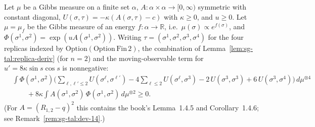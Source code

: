 \begin{lemma}\label{lem:sg-tal:replica-decoupling}
  \leanok
{}
Let $\mu$ be a Gibbs measure on a finite set $\alpha$, $A : \alpha\times\alpha\to[0,\infty)$ symmetric with constant diagonal, $U(\sigma,\tau) = -\kappa (A(\sigma,\tau) - c)$ with $\kappa\ge0$, and $u\ge 0$.
Let $\mu=\mu_f$ be the Gibbs measure of an energy $f:\alpha\to\mathbb R$, i.e.\ $\mu(\sigma)\propto e^{f(\sigma)}$, and $\Phi(\sigma^1,\sigma^2) = \exp(u A(\sigma^1,\sigma^2))$. Writing $\tau=(\sigma^1,\sigma^2,\sigma^3,\sigma^4)$ for the four replicas indexed by $\mathrm{Option}(\mathrm{Option}\,\mathrm{Fin}\,2)$, the combination of Lemma~\ref{lem:sg-tal:replica-deriv} (for $n=2$) and the moving-observable term for $u'=8\kappa\sin s\cos s$ is nonnegative:
\begin{align*}
&\int \Phi(\sigma^1,\sigma^2)\Big(\sum_{\ell,\ell'\le2} U(\sigma^\ell,\sigma^{\ell'}) - 4\sum_{\ell\le2} U(\sigma^\ell,\sigma^{3}) - 2\,U(\sigma^{3},\sigma^{3}) + 6\,U(\sigma^{3},\sigma^{4})\Big)\,d\mu^{\otimes4}\\
&\qquad{}+ 8\kappa\int A(\sigma^1,\sigma^2)\,\Phi(\sigma^1,\sigma^2)\,d\mu^{\otimes2} \ge 0 .
\end{align*}
(For $A=(R_{1,2}-q)^2$ this contains the book's Lemma~1.4.5 and Corollary~1.4.6; see Remark~\ref{rem:sg-tal:dev-14}.)
\end{lemma}
